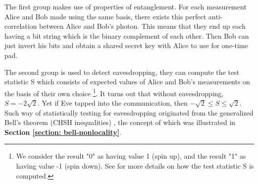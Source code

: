 The first group makes use of properties of entanglement. For each measurement Alice and Bob made using the same basis, there exists this perfect anti-correlation between Alice and Bob's photon. This means that they end up each having a bit string which is the binary complement of each other. Then Bob can just invert his bits and obtain a shared secret key with Alice to use for one-time pad. 

The second group is used to detect eavesdropping, they can compute the test statistic S which consists of expected values of Alice and Bob's measurements on the basis of their own choice \footnote{We consider the result "0" as having value 1 (spin up), and the result "1" as having value -1 (spin down). See \cite{Ekert1991} for more details on how the test statistic S is computed.}. It turns out that without eavesdropping, $S=-2\sqrt{2}$. Yet if Eve tapped into the communication, then $-\sqrt{2} \le S \le \sqrt{2}$. Such way of statistically testing for eavesdropping originated from the generalized Bell's theorem (CHSH inequalities) \cite{bell1964}, the concept of which was illustrated in \textbf{Section \ref{section: bell-nonlocality}}.

